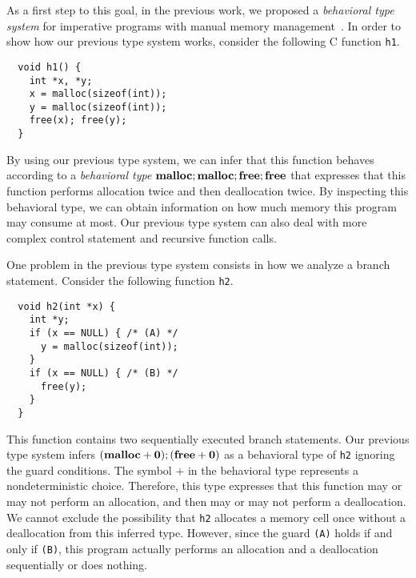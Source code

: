 
As a first step to this goal, in the previous work, we proposed a
\emph{behavioral type system} for imperative programs with manual memory
management~\cite{tanPPL2014}.  In order to show how our previous type
system works, consider the following C function \verb|h1|.
\begin{verbatim}
  void h1() {
    int *x, *y;
    x = malloc(sizeof(int));
    y = malloc(sizeof(int));
    free(x); free(y);
  }
\end{verbatim}
By using our previous type system, we can infer that this function
behaves according to a \emph{behavioral type}
$\mathbf{malloc};\mathbf{malloc};\mathbf{free};\mathbf{free}$ that expresses that this function performs
allocation twice and then deallocation twice.  By inspecting this behavioral
type, we can obtain information on how much memory this program may
consume at most.  Our previous type system can also deal with more
complex control statement and recursive function calls.

One problem in the previous type system consists in how we analyze a
branch statement.  Consider the following function \verb|h2|.
\begin{verbatim}
  void h2(int *x) {
    int *y;
    if (x == NULL) { /* (A) */
      y = malloc(sizeof(int));
    }
    if (x == NULL) { /* (B) */
      free(y);
    }
  }
\end{verbatim}
This function contains two sequentially executed branch statements.  Our
previous type system infers $(\mathbf{malloc} + \mathbf{0}); (\mathbf{free} + \mathbf{0})$ as a
behavioral type of \verb|h2| ignoring the guard conditions.  The symbol
$+$ in the behavioral type represents a nondeterministic choice.
Therefore, this type expresses that this function may or may not perform
an allocation, and then may or may not perform a deallocation.  We
cannot exclude the possibility that \verb|h2| allocates a memory cell
once without a deallocation from this inferred type.  However, since the
guard \verb|(A)| holds if and only if \verb|(B)|, this program actually
performs an allocation and a deallocation sequentially or does nothing.

